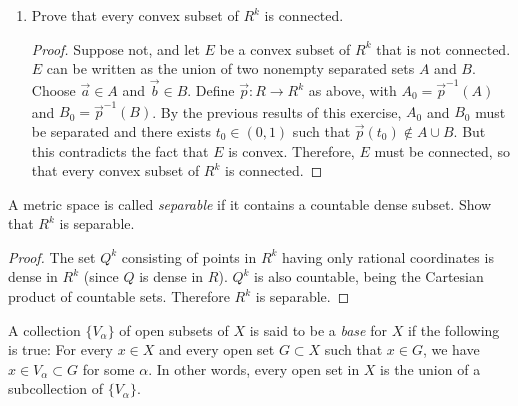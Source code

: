 \begin{enumerate}
\begin{proof}
    are separated. So by Theorem~2.47 there exists $t_0\in(0,1)$ such
    that $t_0\not\in A_0\cup B_0$. Then by definition
    $\vec{p}(t_0)\not\in A\cup B$.
  \end{proof}
\item Prove that every convex subset of $R^k$ is connected.
  \begin{proof}
    Suppose not, and let $E$ be a convex subset of $R^k$ that is not
    connected. $E$ can be written as the union of two nonempty
    separated sets $A$ and $B$. Choose $\vec{a}\in A$ and
    $\vec{b}\in B$. Define $\vec{p}\colon R\to R^k$ as above, with
    $A_0 = \vec{p}^{-1}(A)$ and $B_0 = \vec{p}^{-1}(B)$. By the
    previous results of this exercise, $A_0$ and $B_0$ must be
    separated and there exists $t_0\in(0,1)$ such that
    $\vec{p}(t_0)\not\in A\cup B$. But this contradicts the fact that
    $E$ is convex. Therefore, $E$ must be connected, so that every
    convex subset of $R^k$ is connected.
\end{proof}
\end{enumerate}

 A metric space is called {\em separable} if it contains
a countable dense subset. Show that $R^k$ is separable.
\label{exercise-Rk-is-separable}
\begin{proof}
  The set $Q^k$ consisting of points in $R^k$ having only rational
  coordinates is dense in $R^k$ (since $Q$ is dense in $R$). $Q^k$ is
  also countable, being the Cartesian product of countable
  sets. Therefore $R^k$ is separable.
\end{proof}

 A collection $\{V_\alpha\}$ of open subsets of $X$ is
said to be a {\em base} for $X$ if the following is true: For every
$x\in X$ and every open set $G\subset X$ such that $x\in G$, we have
$x\in V_\alpha\subset G$ for some $\alpha$. In other words, every open
set in $X$ is the union of a subcollection of $\{V_\alpha\}$.

